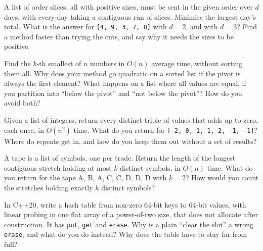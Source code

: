 \begin{question}\label{iq:iv3:algorithms:35}
A list of order slices, all with positive sizes, must be sent in the given order over $d$ days, with every day taking a contiguous run of slices. Minimise the largest day's total. What is the answer for \texttt{[4, 9, 3, 7, 8]} with $d = 2$, and with $d = 3$? Find a method faster than trying the cuts, and say why it needs the sizes to be positive.
\end{question}

\begin{question}\label{iq:iv3:algorithms:36}
Find the $k$-th smallest of $n$ numbers in $O(n)$ average time, without sorting them all. Why does your method go quadratic on a sorted list if the pivot is always the first element? What happens on a list where all values are equal, if you partition into ``below the pivot'' and ``not below the pivot''? How do you avoid both?
\end{question}

\begin{question}\label{iq:iv3:algorithms:37}
Given a list of integers, return every distinct triple of values that adds up to zero, each once, in $O(n^2)$ time. What do you return for \texttt{[-2, 0, 1, 1, 2, -1, -1]}? Where do repeats get in, and how do you keep them out without a set of results?
\end{question}

\begin{question}\label{iq:iv3:algorithms:38}
A tape is a list of symbols, one per trade. Return the length of the longest contiguous stretch holding at most $k$ distinct symbols, in $O(n)$ time. What do you return for the tape A, B, A, C, C, D, D, D with $k = 2$? How would you count the stretches holding exactly $k$ distinct symbols?
\end{question}

\begin{question}\label{iq:iv3:algorithms:39}
In C++20, write a hash table from non-zero 64-bit keys to 64-bit values, with linear probing in one flat array of a power-of-two size, that does not allocate after construction. It has \texttt{put}, \texttt{get} and \texttt{erase}. Why is a plain ``clear the slot'' a wrong \texttt{erase}, and what do you do instead? Why does the table have to stay far from full?
\end{question}

